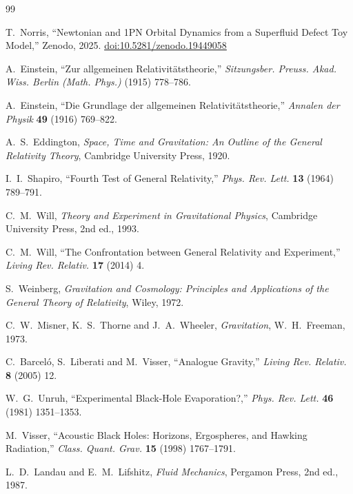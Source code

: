 \documentclass[11pt]{article}
\begin{document}
\begin{thebibliography}{99}

T.~Norris,
``Newtonian and 1PN Orbital Dynamics from a Superfluid Defect Toy Model,''
Zenodo, 2025. \href{https://doi.org/10.5281/zenodo.19449058}{doi:10.5281/zenodo.19449058}

A.~Einstein,
``Zur allgemeinen Relativit\"atstheorie,''
\textit{Sitzungsber. Preuss. Akad. Wiss. Berlin (Math. Phys.)} (1915) 778–786.

A.~Einstein,
``Die Grundlage der allgemeinen Relativit\"atstheorie,''
\textit{Annalen der Physik} \textbf{49} (1916) 769–822.

A.~S.~Eddington,
\textit{Space, Time and Gravitation: An Outline of the General Relativity Theory},
Cambridge University Press, 1920.

I.~I.~Shapiro,
``Fourth Test of General Relativity,''
\textit{Phys. Rev. Lett.} \textbf{13} (1964) 789–791.

C.~M.~Will,
\textit{Theory and Experiment in Gravitational Physics},
Cambridge University Press, 2nd ed., 1993.

C.~M.~Will,
``The Confrontation between General Relativity and Experiment,''
\textit{Living Rev. Relativ.} \textbf{17} (2014) 4.

S.~Weinberg,
\textit{Gravitation and Cosmology: Principles and Applications of the General Theory of Relativity},
Wiley, 1972.

C.~W.~Misner, K.~S.~Thorne and J.~A.~Wheeler,
\textit{Gravitation},
W.~H.~Freeman, 1973.

C.~Barcel\'o, S.~Liberati and M.~Visser,
``Analogue Gravity,''
\textit{Living Rev. Relativ.} \textbf{8} (2005) 12.

W.~G.~Unruh,
``Experimental Black-Hole Evaporation?,''
\textit{Phys. Rev. Lett.} \textbf{46} (1981) 1351–1353.

M.~Visser,
``Acoustic Black Holes: Horizons, Ergospheres, and Hawking Radiation,''
\textit{Class. Quant. Grav.} \textbf{15} (1998) 1767–1791.

L.~D.~Landau and E.~M.~Lifshitz,
\textit{Fluid Mechanics},
Pergamon Press, 2nd ed., 1987.


\end{thebibliography}
\end{document}
